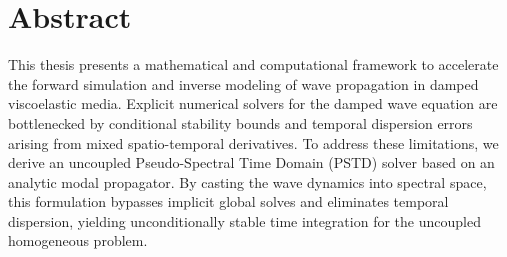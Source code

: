 \documentclass{Configuration_Files/PoliMi3i_thesis}
\begin{document}


\pagestyle{empty} %
\frontmatter %


\startpreamble
\setcounter{page}{1} %

\chapter*{Abstract} 
This thesis presents a mathematical and computational framework to accelerate the forward simulation and inverse modeling of wave propagation in damped viscoelastic media. Explicit numerical solvers for the damped wave equation are bottlenecked by conditional stability bounds and temporal dispersion errors arising from mixed spatio-temporal derivatives. To address these limitations, we derive an uncoupled Pseudo-Spectral Time Domain (PSTD) solver based on an analytic modal propagator. By casting the wave dynamics into spectral space, this formulation bypasses implicit global solves and eliminates temporal dispersion, yielding unconditionally stable time integration for the uncoupled homogeneous problem.
\end{document}
